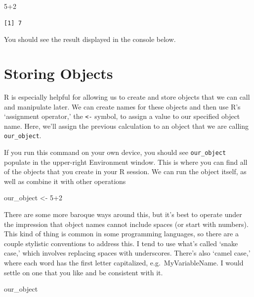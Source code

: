 \documentclass[
  letterpaper,
  DIV=11,
  numbers=noendperiod]{scrreprt}
\newenvironment{Shaded}{\begin{snugshade}}{\end{snugshade}}
\newcommand{\DecValTok}[1]{\textcolor[rgb]{0.68,0.00,0.00}{#1}}
\newcommand{\NormalTok}[1]{\textcolor[rgb]{0.00,0.23,0.31}{#1}}
\newcommand{\OtherTok}[1]{\textcolor[rgb]{0.00,0.23,0.31}{#1}}
\newcommand{\SpecialCharTok}[1]{\textcolor[rgb]{0.37,0.37,0.37}{#1}}
\begin{document}
\begin{Shaded}
\begin{Highlighting}[]
\DecValTok{5}\SpecialCharTok{+}\DecValTok{2}
\end{Highlighting}
\end{Shaded}

\begin{verbatim}
[1] 7
\end{verbatim}

You should see the result displayed in the console below.

\section{Storing Objects}\label{storing-objects}

R is especially helpful for allowing us to create and store objects that
we can call and manipulate later. We can create names for these objects
and then use R's `assignment operator,' the \texttt{\textless{}-}
symbol, to assign a value to our specified object name. Here, we'll
assign the previous calculation to an object that we are calling
\texttt{our\_object}.

If you run this command on your own device, you should see
\texttt{our\_object} populate in the upper-right Environment window.
This is where you can find all of the objects that you create in your R
session. We can run the object itself, as well as combine it with other
operations

\begin{Shaded}
\begin{Highlighting}[]
\NormalTok{our\_object }\OtherTok{\textless{}{-}} \DecValTok{5}\SpecialCharTok{+}\DecValTok{2}
\end{Highlighting}
\end{Shaded}

There are some more baroque ways around this, but it's best to operate
under the impression that object names cannot include spaces (or start
with numbers). This kind of thing is common in some programming
languages, so there are a couple stylistic conventions to address this.
I tend to use what's called `snake case,' which involves replacing
spaces with underscores. There's also `camel case,' where each word has
the first letter capitalized, e.g.~MyVariableName. I would settle on one
that you like and be consistent with it.

\begin{Shaded}
\begin{Highlighting}[]
\NormalTok{our\_object}
\end{Highlighting}
\end{Shaded}
\end{document}
